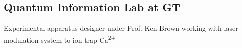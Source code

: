 \documentclass[letterpaper, article]{deedy-resume-openfont}
\begin{document}
\begin{minipage}[t]{0.33\textwidth}
\subsection{Quantum Information \hfill Lab at GT \hfill}
Experimental apparatus designer under Prof. Ken Brown working with laser modulation system to ion trap Ca\textsuperscript{2+}


\end{minipage}
\end{document}
